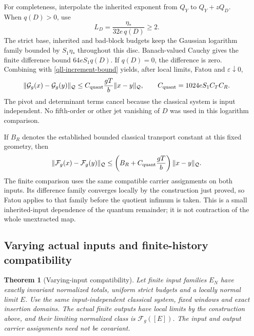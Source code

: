 \documentclass[11pt]{article}
\newtheorem{theorem}{Theorem}[section]
\theoremstyle{remark}
\begin{document}
For completeness, interpolate the inherited exponent from
\(Q_Y\) to \(Q_Y+zQ_D\). When \(q(D)>0\), use
\begin{equation}
 L_D=\frac{\eta_*}{32e\,q(D)}\ge2.
 \label{qll-interpolation-radius}
\end{equation}
The strict base, inherited and bad-block budgets keep the
Gaussian logarithm family bounded by \(S_1\eta_*\) throughout
this disc. Banach-valued Cauchy gives the finite difference
bound \(64eS_1q(D)\). If \(q(D)=0\), the difference is zero.
Combining with \eqref{qll-increment-bound} yields, after
local limits, Fatou and \(\varepsilon\downarrow0\),
\begin{equation}
 \|\mathcal G_g(x)-\mathcal G_g(y)\|_{\mathcal Q}
 \le C_{\rm quant}\frac{gT}{b}\|x-y\|_{\mathcal Q},
 \qquad C_{\rm quant}=1024eS_1C_TC_R .
 \label{qll-quantum-Lipschitz}
\end{equation}
The pivot and determinant terms cancel because the classical
system is input independent. No fifth-order or other jet
vanishing of \(D\) was used in this logarithm comparison.

If \(B_R\) denotes the established bounded classical transport
constant at this fixed geometry, then
\begin{equation}
 \|\mathcal F_g(x)-\mathcal F_g(y)\|_{\mathcal Q}
 \le\left(B_R+C_{\rm quant}\frac{gT}{b}\right)
                                  \|x-y\|_{\mathcal Q}.
 \label{qll-full-Lipschitz}
\end{equation}
The finite comparison uses the same compatible carrier
assignments on both inputs. Its difference family converges
locally by the construction just proved, so Fatou applies
to that family before the quotient infimum is taken.
This is a small inherited-input dependence of the quantum
remainder; it is not contraction of the whole unextracted map.

\subsection{Varying actual inputs and finite-history compatibility}
\label{qll-varying-section}

\begin{theorem}[Varying-input compatibility]
\label{qll-varying-theorem}
Let finite input families \(E_N\) have exactly invariant
normalized totals, uniform strict budgets and a locally normal
limit \(E\). Use the same input-independent classical system,
fixed windows and exact insertion domains. The actual finite
outputs have local limits by the construction above, and their
limiting normalized class is \(\mathcal F_g([E])\).
The input and output carrier assignments need not be covariant.
\end{theorem}
\end{document}

